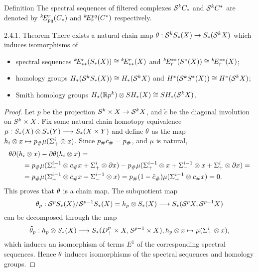 \documentclass{article}
\begin{document}
\begin{subsubsection}{ Definition}
The spectral sequences of filtered complexes $\mathcal S^kC_*$ and $\mathcal S^kC^*$ 
are denoted by $\E k/r/pq/(C_*)$ and $\E k/pq/r/(C^*)$ respectively.
\begin{proclaim}{{2.4.1. Theorem} There exists a natural chain map
$\theta:\mathcal S^kS_*(X)\to S_*(\mathcal S^kX)$ which induces isomorphisms of
\begin{itemize}
\item spectral sequences $\E k/r/**/(S_*(X))\cong \E k/r/**/(X)$
and $\E k/**/r/(S^*(X))\cong \E k/**/r/(X)$;
\item homology groups $H_*(\mathcal S^kS_*(X))\cong H_*(\mathcal S^kX)$ and
$H^*(\mathcal S^kS^*(X))\cong H^*(\mathcal S^kX)$;
\item Smith homology groups $H_*(\mathbb R p^k)\otimes SH_*(X)\cong SH_*(\mathcal S^kX)$.
\end{itemize}
}\end{proclaim}
\begin{proof}{ Let $p$ be the projection $S^k\times X\to \mathcal S^kX$, and
$\tilde c$ be the diagonal involution on $S^k\times X$. Fix some natural
chain homotopy equivalence $\mu:S_*(X)\otimes S_*(Y)\longrightarrow S_*(X\times Y)$
and define $\theta$ as the map $h_i\otimes x\mapsto p_\#\mu(\Sigma_+^i\otimes x)$.
Since $p_\#\tilde c_\#=p_\#$, and $\mu$ is natural,
\begin{align}
&\theta\partial(h_i\otimes x)-\partial\theta(h_i\otimes x)=\\
&\qquad=p_\#\mu(\Sigma_+^{i-1}\otimes c_\# x+\Sigma_+^i\otimes\partial x)-
  p_\#\mu(\Sigma_+^{i-1}\otimes x+\Sigma_-^{i-1}\otimes x+\Sigma_+^i\otimes\partial x)=\\
&\qquad=p_\#\mu(\Sigma_+^{i-1}\otimes c_\# x-\Sigma_-^{i-1}\otimes x)=
p_\#(1-\tilde c_\#)\mu(\Sigma_+^{i-1}\otimes c_\# x)=0.
\end{align}
This proves that $\theta$ is a chain map. The subquotient map
$$
\theta_p:\mathcal S^pS_*(X)/\mathcal S^{p-1}S_*(X)=h_p\otimes S_*(X)\longrightarrow S_*(\mathcal S^pX,\mathcal S^{p-1}X)
$$
can be decomposed through the map
$$
\tilde{\theta}_p:h_p\otimes S_*(X)\longrightarrow S_*(D_+^p\times X,S^{p-1}\times X),\\
h_p\otimes x\mapsto\mu(\Sigma_+^i\otimes x),
$$
which induces an isomorphism of terms $E^1$ of the corresponding spectral
sequences. Hence $\theta$ induces isomorphisms of the spectral sequences
and homology groups.

}
\end{proof}
\end{subsubsection}
\end{document}
